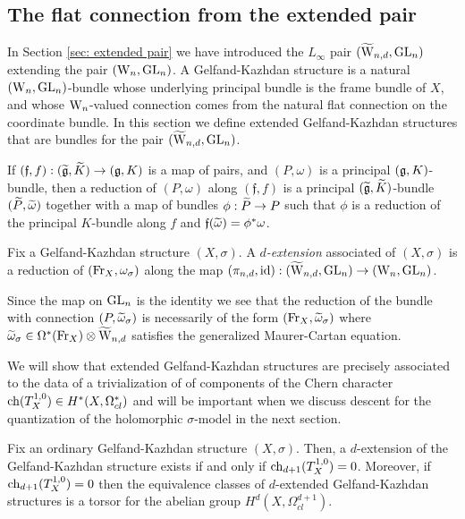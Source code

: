 \documentclass[10pt]{amsart}
\def\brian{\textcolor{blue}{BW: }\textcolor{blue}}
\begin{document}

\subsection{The flat connection from the extended pair}

In Section \ref{sec: extended pair} we have introduced the $L_\infty$ pair $(\TVectd, \GL_n)$ extending the pair $(\Vect, \GL_n)$.
A Gelfand-Kazhdan structure is a natural $(\Vect,\GL_n)$-bundle whose underlying principal bundle is the frame bundle of $X$, and whose $\Vect$-valued connection comes from the natural flat connection on the coordinate bundle. 
In this section we define extended Gelfand-Kazhdan structures that are bundles for the pair $(\TVectd,\GL_n)$.

If $(\mathfrak{f},f) : (\Tilde{\fg},\Tilde{K}) \to (\fg, K)$ is a map of pairs, and $(P,\omega)$ is a principal $(\fg,K)$-bundle, then a reduction of $(P,\omega)$ along $(\mathfrak{f},f)$ is a principal $(\Tilde{\fg}, \Tilde{K})$-bundle $(\Tilde{P}, \Tilde{\omega})$ together with a map of bundles $\phi : \Tilde{P} \to P$ such that $\phi$ is a reduction of the principal $K$-bundle along $f$ and $\mathfrak{f}(\Tilde{\omega}) = \phi^*\omega$.

\begin{dfn}
Fix a Gelfand-Kazhdan structure $(X,\sigma)$.  
A {\em $d$-extension} associated of $(X,\sigma)$ is a reduction of $(\Fr_X, \omega_{\sigma})$ along the map $(\pi_{n,d}, {\rm id}) : (\TVectd,\GL_n) \to (\Vect, \GL_n)$.
\end{dfn}

Since the map on $\GL_n$ is the identity we see that the reduction of the bundle with connection $(P, \Tilde{\omega}_\sigma)$ is necessarily of the form $(\Fr_X, \Tilde{\omega}_\sigma)$ where $\Tilde{\omega}_\sigma \in \Omega^*(\Fr_X) \tensor \TVectd$ satisfies the generalized Maurer-Cartan equation.

We will show that extended Gelfand-Kazhdan structures are precisely associated to the data of a trivialization of of components of the Chern character $\ch(T_X^{1,0}) \in H^*(X, \Omega^*_{cl})$ and will be important when we discuss descent for the quantization of the holomorphic $\sigma$-model in the next section.

\begin{prop}\label{prop: extended GK}
Fix an ordinary Gelfand-Kazhdan structure $(X,\sigma)$.
Then, a $d$-extension of the Gelfand-Kazhdan structure exists if and only if $\ch_{d+1}(T^{1,0}_X) = 0$.
Moreover, if $\ch_{d+1}(T_X^{1,0}) = 0$ then the equivalence classes of $d$-extended Gelfand-Kazhdan structures is a torsor for the abelian group $H^{d}(X , \Omega^{d+1}_{cl})$.
\end{prop}
\end{document}
